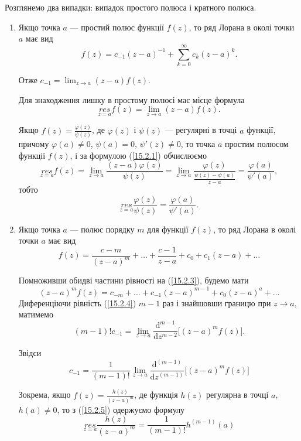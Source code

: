 \documentclass[12pt,fleqn]{article}
\theoremstyle{theorem}
\theoremstyle{proof}
\numberwithin{figure}{section}
\numberwithin{equation}{section}
\begin{document}
Розглянемо два випадки: випадок простого полюса і кратного полюса.
\begin{enumerate}
  \item
  Якщо точка $a$ --- простий полюс функції $f(z)$, то ряд Лорана в околі точки $a$ має вид
    \[f(z)=c_{-1}(z-a)^{-1}+\sum_{k=0}^{\infty}c_k(z-a)^k.\]

    Отже $c_{-1}=\lim_{z\to a}(z-a)f(z)$.

    Для знаходження лишку в простому полюсі має місце формула
    \begin{equation}\label{15.2.1}
    \underset{z=a}{res}f(z)=\lim_{z\to a}(z-a)f(z).
    \end{equation}

    Якщо $f(z)=\frac{\varphi(z)}{\psi(z)}$, де $\varphi(z)$ і $\psi(z)$ --- регулярні в точці $a$ функції, причому $\varphi(a)\neq 0$, $\psi(a)=0$, $\psi'(z)\neq 0$, то точка $a$ простим полюсом функції $f(z)$, і за формулою (\ref{15.2.1}) обчислюємо
    \[
    \underset{z=a}{res}f(z)=\lim_{z\to a}\frac{(z-a)\varphi(z)} {\psi(z)}=\lim_{z\to a}\frac{\varphi(z)}{\frac{\psi(z)-\psi(a)}{z-a}}=\frac{\varphi(a)}
    {\psi'(a)},
    \]
    тобто
    \begin{equation}\label{15.2.2}
    \underset{z=a}{res}\frac{\varphi(z)}{\psi(z)}=\frac{\varphi(a)}
    {\psi'(a)}.
    \end{equation}
    \item
    Якщо точка $a$ --- полюс порядку $m$ для функції $f(z)$, то ряд Лорана в околі точки $a$ має вид
    \begin{equation}\label{15.2.3}
    f(z)=\frac{c-m}{(z-a)^m}+\dots + \frac{c-1}{z-a}+ c_0 + c_1(z-a)+\dots
    \end{equation}

    Помноживши обидві частини рівності на (\ref{15.2.3}), будемо мати
    \begin{equation}\label{15.2.4}
    (z-a)^m f(z)=c_{-m}+\dots+c_{-1}(z-a)^{m-1}+c_0(z-a)^a+\dots
    \end{equation}
    Диференціючи рівність (\ref{15.2.4}) $m-1$ раз і знайшовши границю при $z\to a$, матимемо
    \[(m-1)!c_{-1}=\lim_{z\to a}\frac{\mathrm{d}^{m-1}}{\mathrm{d}z^{m-2}}\Big[(z-a)^m f(z)\Big].
    \]

    Звідси
    \begin{equation}\label{15.2.5}
    c_{-1}=\frac{1}{(m-1)!}\lim_{z\to a}\frac{\mathrm{d}^{(m-1)}}{\mathrm{d}z^{(m-1)}}\Big[(z-a)^m f(z)\Big]
    \end{equation}

    Зокрема, якщо $f(z)=\frac{h(z)}{(z-a)^m}$, де функція $h(z)$ регулярна в точці $a$, $h(a)\neq0$, то з (\ref{15.2.5}) одержуємо формулу
    \begin{equation}\label{15.2.6}
        \underset{z=a}{res}\frac{h(z)}{(z-a)^m}=\frac{1}{(m-1)!}h^{(m-1)}(a)
    \end{equation}
\end{enumerate}
\end{document}
